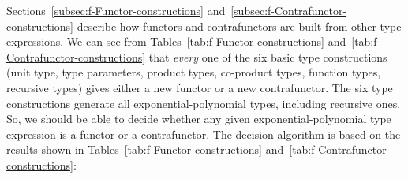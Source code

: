 Sections~\ref{subsec:f-Functor-constructions} and~\ref{subsec:f-Contrafunctor-constructions}
describe how functors and contrafunctors are built from other type
expressions. We can see from Tables~\ref{tab:f-Functor-constructions}
and~\ref{tab:f-Contrafunctor-constructions} that \emph{every} one
of the six basic type constructions
(unit type, type parameters, product types, co-product types, function
types, recursive types) gives either a new functor or a new contrafunctor.
The six type constructions generate all exponential-polynomial
types, including recursive ones. So, we should be able to decide whether
any given exponential-polynomial type expression is a functor or a
contrafunctor. The decision algorithm is based on the results shown
in Tables~\ref{tab:f-Functor-constructions} and~\ref{tab:f-Contrafunctor-constructions}:
